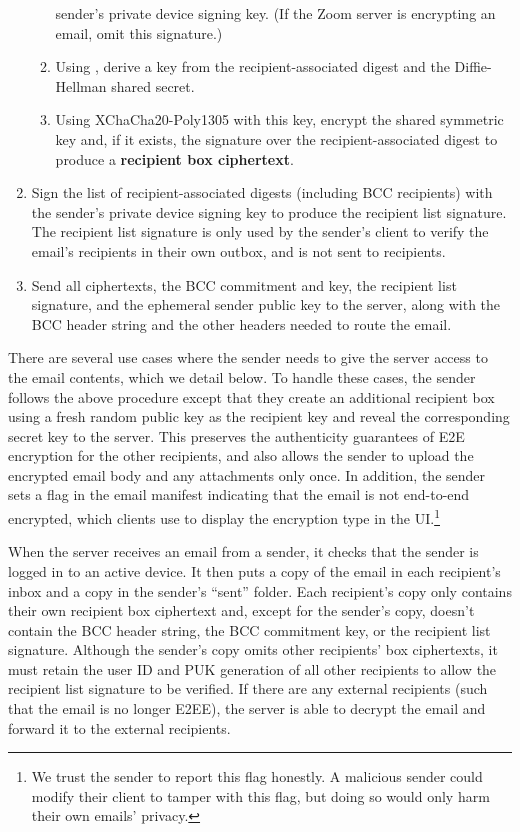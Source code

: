 \begin{enumerate}
\begin{enumerate}
sender's private device signing key. (If the Zoom server is encrypting an email, omit this
signature.)
\item Using \HMACSHATWO, derive a key from the recipient-associated digest and the Diffie-Hellman
shared secret.
\item Using XChaCha20-Poly1305 with this key, encrypt the shared symmetric key and, if it exists,
the signature over the recipient-associated digest to produce a \textbf{recipient box
ciphertext}.
\end{enumerate}
\item Sign the list of recipient-associated digests (including BCC recipients) with the sender's
private device signing key to produce the recipient list signature. The recipient list signature is
only used by the sender's client to verify the email's recipients in their own outbox, and is not
sent to recipients.
\item Send all ciphertexts, the BCC commitment and key, the recipient list signature, and the
ephemeral sender public key to the server, along with the BCC header string and the other headers
needed to route the email.
\end{enumerate}

There are several use cases where the sender needs to give the server access to the email contents,
which we detail below. To handle these cases, the sender follows the above procedure except that
they create an additional recipient box using a fresh random public key as the recipient key and
reveal the corresponding secret key to the server. This preserves the authenticity guarantees of E2E
encryption for the other recipients, and also allows the sender to upload the encrypted email body
and any attachments only once. In addition, the sender sets a flag in the email manifest indicating
that the email is not end-to-end encrypted, which clients use to display the encryption type in the
UI.\footnote{We trust the sender to report this flag honestly. A malicious sender could modify their
client to tamper with this flag, but doing so would only harm their own emails' privacy.}

When the server receives an email from a sender, it checks that the sender is logged in to an active
device. It then puts a copy of the email in each recipient's inbox and a copy in the sender's
``sent'' folder. Each recipient's copy only contains their own recipient box ciphertext and, except
for the sender's copy, doesn't contain the BCC header string, the BCC commitment key, or the
recipient list signature. Although the sender's copy omits other recipients' box ciphertexts, it
must retain the user ID and PUK generation of all other recipients to allow the recipient list
signature to be verified. If there are any external recipients (such that the email is no longer
E2EE), the server is able to decrypt the email and forward it to the external recipients.


